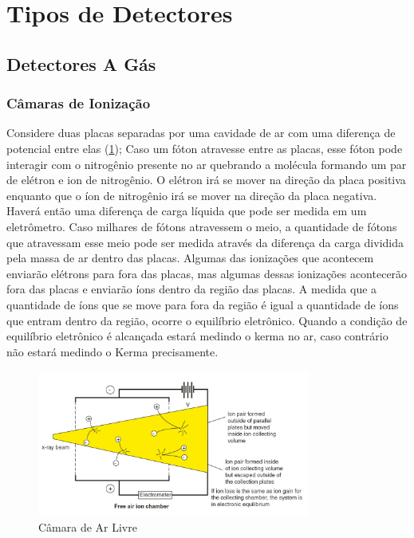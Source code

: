 \documentclass[11pt,a4paper]{article}
\begin{document}
\section{Tipos de Detectores}

\subsection*{Detectores A Gás}

\subsubsection*{Câmaras de Ionização}



	Considere duas placas separadas por uma cavidade de ar com uma diferença de potencial entre elas (\ref{fig:camaraArLivre}); Caso um fóton atravesse entre as placas, esse fóton pode interagir com o nitrogênio presente no ar quebrando a molécula formando um par de elétron e ion de nitrogênio. O elétron irá se mover na direção da placa positiva enquanto que o íon de nitrogênio irá se mover na direção da placa negativa. Haverá então uma diferença de carga líquida que pode ser medida em um eletrômetro. Caso milhares de fótons atravessem o meio, a quantidade de fótons que atravessam esse meio pode ser medida através da diferença da carga dividida pela massa de ar dentro das placas. Algumas das ionizações que acontecem enviarão elétrons para fora das placas, mas algumas dessas ionizações acontecerão fora das placas e enviarão íons dentro da região das placas. A medida que a quantidade de íons que se move para fora da região é igual a quantidade de íons que entram dentro da região, ocorre o equilíbrio eletrônico. Quando a condição de equilíbrio eletrônico é alcançada estará medindo o kerma no ar, caso contrário não estará medindo o Kerma precisamente. 
	
	\begin{figure}[h]
		\centering
		\includegraphics[width=0.8\textwidth]{Imagens/camaraArLivre.jpg}
		\caption{Câmara de Ar Livre}
		\label{fig:camaraArLivre}
	\end{figure}
\end{document}
